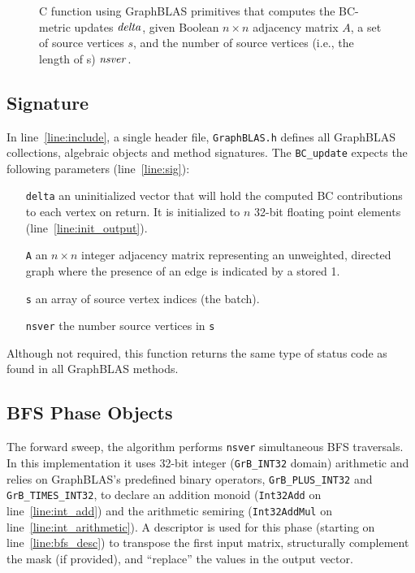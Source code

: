 \begin{figure*}[h]
\caption{C function using GraphBLAS primitives that computes the BC-metric
updates ${\it delta}$, given Boolean $n \times n$ adjacency matrix $A$, a
set of source vertices $s$, and the number of source vertices (i.e., the 
length of s) ${\it nsver}$.}
\label{Fig:BClisting}
{\scriptsize

}
\end{figure*}

\subsection{Signature}

In line~\ref{line:include}, a single header file, {\tt GraphBLAS.h}  
 defines all GraphBLAS collections, algebraic objects and method signatures.  
 The {\tt BC\_update} expects the following parameters (line~\ref{line:sig}):

\begin{itemize} [leftmargin=0.6in]
\item[\tt delta] an uninitialized vector that will hold the computed BC contributions to each
                 vertex on return.  It is initialized to $n$ 32-bit floating
                 point elements (line~\ref{line:init_output}).
\item[\tt A]     an $n\times n$ integer adjacency matrix representing an
                 unweighted, directed graph where the presence of an edge
                 is indicated by a stored 1.
\item[\tt s]     an array of source vertex indices (the batch).
\item[\tt nsver] the number source vertices in {\tt s}
\end{itemize}
\noindent
Although not required, this function returns the same type of status code as
found in all GraphBLAS methods.

\subsection{BFS Phase Objects}
 
The forward sweep, the algorithm performs {\tt nsver} simultaneous BFS traversals.  In this
implementation it uses 32-bit integer ({\tt GrB\_INT32} domain) arithmetic and
relies on GraphBLAS's predefined binary operators, {\tt GrB\_PLUS\_INT32} and 
{\tt GrB\_TIMES\_INT32}, to declare an addition monoid ({\tt Int32Add} on line~\ref{line:int_add})
and the arithmetic semiring ({\tt Int32AddMul} on line~\ref{line:int_arithmetic}).
A descriptor is used for this phase (starting on line~\ref{line:bfs_desc})
to transpose the first input matrix, structurally complement the mask (if provided),
and ``replace'' the values in the output vector.

